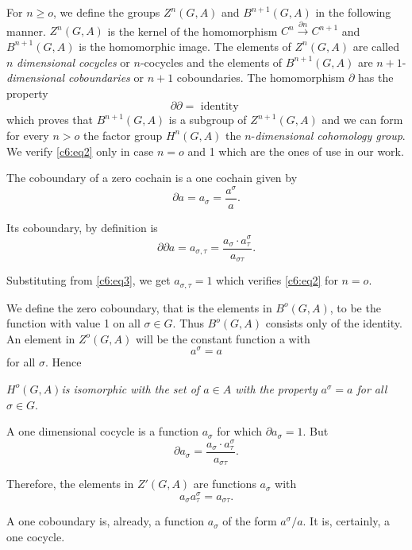 For $n \geq o$, we define the groups $Z^n(G,A)$ and $B^{n+1}(G,A)$ in\break 
the following manner. $Z^n(G,A)$ is the kernel of the homomorphism
$C^n \overset{\partial n} \longrightarrow C^{n+1}$ and
$B^{n+1}(G,A)$ 
is the homomorphic image. The elements of $Z^n(G,A)$ are called $n$
\textit{dimensional cocycles} or $n$-cocycles and the elements of
$B^{n+1}(G,A)$ are $n+1$-\textit{dimensional coboun\-daries} or $n+1$
coboundaries. The homomorphism $\partial$ has the property 
\begin{equation*}
\partial \partial=\text{ identity } \tag{2}\label{c6:eq2}
\end{equation*}
which proves that $B^{n+1}(G,A)$ is a subgroup of $Z^{n+1}(G,A)$ and
we can form for every $n > o$ the factor group $H^n(G,A)$ the
$n$-\textit{dimensional cohomology group}. We verify \eqref{c6:eq2} only in
case $n=o$ and 1 which are the ones of use in our work. 

The coboundary of a zero cochain is a one cochain given by
\begin{equation*}
\partial a=a_\sigma = \frac{a^\sigma}{a}. \tag{3}\label{c6:eq3}
\end{equation*}

Its coboundary, by definition is
$$
\partial \partial a=a_{\sigma,
 \tau}=\frac{a_\sigma \cdot a^\sigma_\tau}{a_{\sigma \tau}}.
 $$
 
 Substituting from \eqref{c6:eq3}, we get $a_{\sigma, \tau}=1$ which
 verifies \eqref{c6:eq2} for $n=o$.  
 
 We define the zero coboundary, that is the elements in $B^o(G,A)$, to
 be the function with value 1 on all $\sigma \in G$. Thus $B^o(G,A)$
 consists only of the identity. An element in $Z^o(G,A)$ will be the
 constant function a with 
 $$
 a^\sigma =a
 $$
 for all $\sigma$. Hence
 
 $H^o(G,A)$\pageoriginale \textit{is isomorphic with the set of $a \in
   A$ with the property $a^\sigma = a$ for all $\sigma \in G$}.  
 
 A one dimensional cocycle is a function $a_\sigma$ for which
 $\partial a_\sigma =1$. But 
 $$
 \partial a_\sigma=\frac{a_\sigma \cdot a^\sigma_\tau}{a_{\sigma
     \tau}}. 
 $$
 
  Therefore, the elements in $Z'(G,A)$ are functions $a_\sigma$ with
 $$
 a_\sigma a^\sigma_\tau =a_{\sigma \tau}.
 $$
 
 A one coboundary is, already, a function $a_\sigma$ of the form
 $a^\sigma/a$. It is, certainly, a one cocycle. 
 

